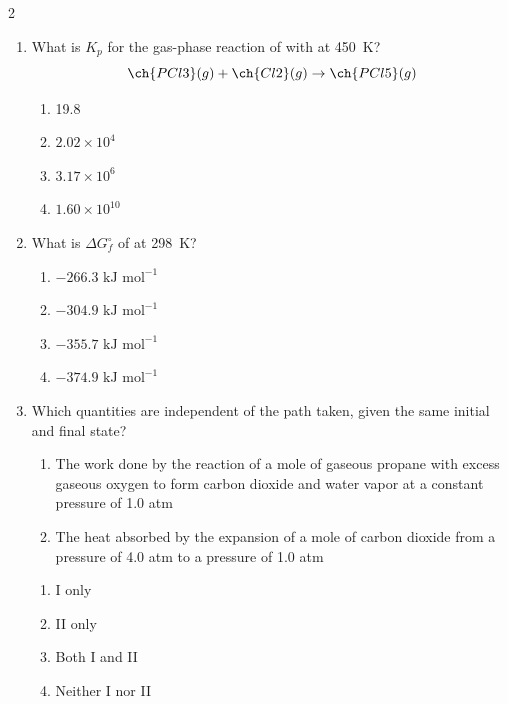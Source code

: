\documentclass[titlepage,10pt,letterpaper]{article}
\begin{document}
\begin{multicols}{2}
\begin{enumerate}[leftmargin=*,resume]
\item What is $K_p$ for the gas-phase reaction of  with  at 450~K?
\[ \ch{PCl3}(g) + \ch{Cl2}(g) \rightarrow \ch{PCl5}(g) \]
\begin{enumerate}[label=(\alph*)]
    \item 19.8
    \item $2.02\times 10^4$
    \item $3.17\times 10^6$
    \item $1.60\times 10^{10}$
\end{enumerate}

\item What is $\Delta G^\circ_f$ of  at 298~K?
\begin{enumerate}[label=(\alph*)]
    \item $-266.3\text{ kJ mol}^{-1}$
    \item $-304.9\text{ kJ mol}^{-1}$
    \item $-355.7\text{ kJ mol}^{-1}$
    \item $-374.9\text{ kJ mol}^{-1}$
\end{enumerate}

\item Which quantities are independent of the path taken, given the same initial and final state?
\begin{enumerate}[label=\Roman*.]
    \item The work done by the reaction of a mole of gaseous propane with excess gaseous oxygen to form carbon dioxide and water vapor at a constant pressure of 1.0 atm
    \item The heat absorbed by the expansion of a mole of carbon dioxide from a pressure of 4.0 atm to a pressure of 1.0 atm
\end{enumerate}
\begin{enumerate}[label=(\alph*)]
    \item I only
    \item II only
    \item Both I and II
    \item Neither I nor II
\end{enumerate}


\end{enumerate}
\end{multicols}
\end{document}
